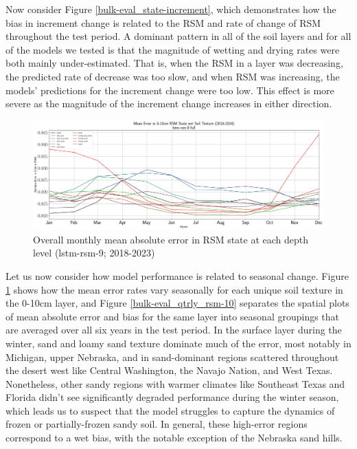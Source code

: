 Now consider Figure \ref{bulk-eval_state-increment}, which demonstrates how the bias in increment change is related to the RSM and rate of change of RSM throughout the test period. A dominant pattern in all of the soil layers and for all of the models we tested is that the magnitude of wetting and drying rates were both mainly under-estimated. That is, when the RSM in a layer was decreasing, the predicted rate of decrease was too slow, and when RSM was increasing, the models' predictions for the increment change were too low. This effect is more severe as the magnitude of the increment change increases in either direction.

\begin{figure}[h!]
    \centering
    \includegraphics[width=.99\linewidth,draft=false]{figures/grid-eval_qtrly/eval-grid_full_lstm-rsm-9_pixelwise-time-stats_monthly-txtr-abs-err-state-rsm-10.png}

    \caption{Overall monthly mean absolute error in RSM state at each depth level (lstm-rsm-9; 2018-2023)}
    \label{bulk-eval_monthly_txtr-error_rsm-10}
\end{figure}

Let us now consider how model performance is related to seasonal change. Figure \ref{bulk-eval_monthly_txtr-error_rsm-10} shows how the mean error rates vary seasonally for each unique soil texture in the 0-10cm layer, and Figure \ref{bulk-eval_qtrly_rsm-10} separates the spatial plots of mean absolute error and bias for the same layer into seasonal groupings that are averaged over all six years in the test period. In the surface layer during the winter, sand and loamy sand texture dominate much of the error, most notably in Michigan, upper Nebraska, and in sand-dominant regions scattered throughout the desert west like Central Washington, the Navajo Nation, and West Texas. Nonetheless, other sandy regions with warmer climates like Southeast Texas and Florida didn't see significantly degraded performance during the winter season, which leads us to suspect that the model struggles to capture the dynamics of frozen or partially-frozen sandy soil. In general, these high-error regions correspond to a wet bias, with the notable exception of the Nebraska sand hills.


